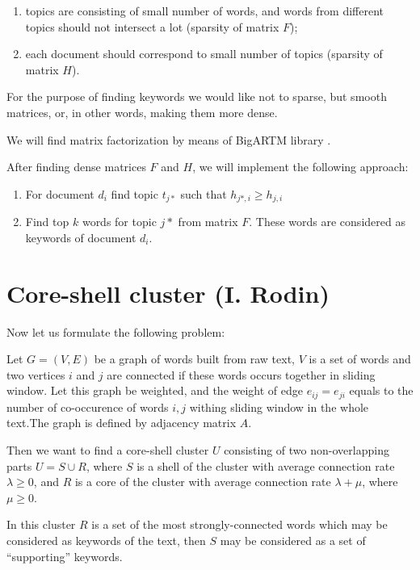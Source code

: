 \documentclass[a4paper]{article}
\begin{document}
\begin{enumerate}
\item topics are consisting of small number of words, and words from different topics should not intersect a lot (sparsity of matrix $F$);
\item each document should correspond to small number of topics (sparsity of matrix $H$).
\end{enumerate}

For the purpose of finding keywords we would like not to sparse, but smooth matrices, or, in other words, making them more dense.

We will find matrix factorization by means of BigARTM library \cite{vorontsov2014additive}.

After finding dense matrices $F$ and $H$, we will implement the following approach:

\begin{enumerate}
\item For document $d_i$ find topic $t_{j*}$ such that $h_{j*, i}\geq h_{j, i}$
\item Find top $k$ words for topic $j*$ from matrix $F$. These words are considered as keywords of document $d_i$.
\end{enumerate}

\section*{Core-shell cluster (I. Rodin)}

Now let us formulate the following problem:

Let $G = (V, E)$ be a graph of words built from raw text, $V$ is a set of words and two vertices $i$ and $j$ are connected if these words occurs together in sliding window. Let this graph be weighted, and the weight of edge $e_{ij} = e_{ji}$ equals to the number of co-occurence of words $i, j$ withing sliding window in the whole text.The graph is defined by adjacency matrix $A$.

Then we want to find a core-shell cluster $U$ consisting of two non-overlapping parts $U = S \cup R$, where $S$ is a shell of the cluster with average connection rate $\lambda \geq 0$,
and $R$ is a core of the cluster with average connection rate $\lambda + \mu$, where $\mu\geq0$.

In this cluster $R$ is a set of the most strongly-connected words which may be considered as keywords of the text, then $S$ may be considered as a set of ``supporting'' keywords.
\end{document}
